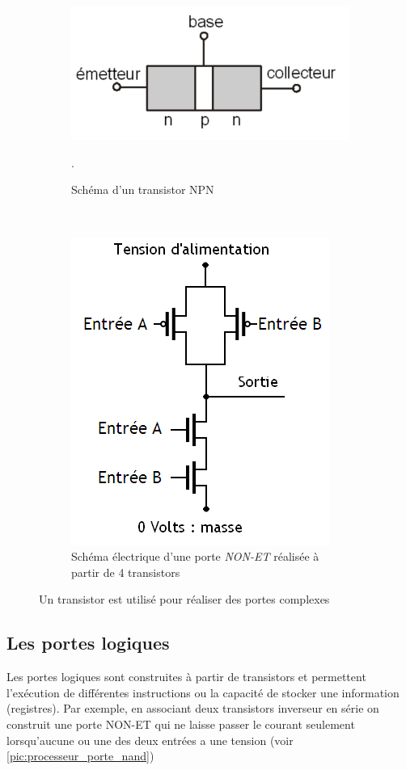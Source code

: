 \begin{figure}[htbp]
    \centering
    \begin{subfigure}[b]{0.45\linewidth}\centering
        \includegraphics[width=\linewidth]{images/transistor.png}
        \caption{\label{pic:transistor} Schéma d'un transistor NPN \cite{GeraldHuguenin2018}}.
    \end{subfigure}
    ~ %
    \begin{subfigure}[b]{0.45\linewidth}\centering
        \includegraphics[width=0.5\linewidth]{images/processeur_porte_nand.png}
        \caption{\label{pic:processeur_porte_nand} Schéma électrique d'une porte \textit{NON-ET} réalisée à partir de 4 transistors \cite{Wikibooks2019PorteNand}}
    \end{subfigure}
    \caption{Un transistor est utilisé pour réaliser des portes complexes  }\label{pic:transistor_usage}
\end{figure}




\subsection{Les portes logiques}
Les portes logiques sont construites à partir de transistors et permettent l'exécution de différentes instructions ou la capacité de stocker une information (registres). Par exemple, en associant deux transistors inverseur en série on construit une porte NON-ET qui ne laisse passer le courant seulement lorsqu'aucune ou une des deux entrées a une tension (voir \autoref{pic:processeur_porte_nand})



